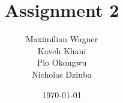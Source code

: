 \author{Maximilian Wagner\\Kaveh Khani\\Pio Okongwu\\Nicholas Dziuba}

\title{Assignment 2}
\date{\today}

\newlanguagecommand{\semester}

\newcommand{\supervisor}{Prof. Dr. Udo Krieger}

\gittrue
